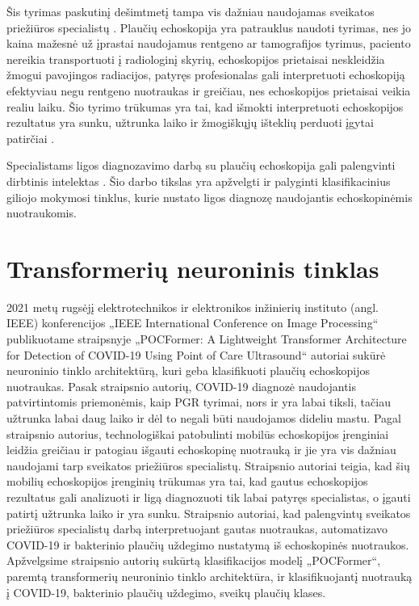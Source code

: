 \documentclass[fleqn]{VUMIFKompMagistrinis}
\begin{document}
\par
Šis tyrimas paskutinį dešimtmetį tampa vis dažniau naudojamas sveikatos priežiūros specialistų \cite{demi2023new}. Plaučių echoskopija yra patrauklus naudoti tyrimas, nes jo kaina mažesnė už įprastai naudojamus rentgeno ar tamografijos tyrimus, paciento nereikia transportuoti į radiologinį skyrių, echoskopijos prietaisai neskleidžia žmogui pavojingos radiacijos, patyręs profesionalas gali interpretuoti echoskopiją efektyviau negu rentgeno nuotraukas ir greičiau, nes echoskopijos prietaisai veikia realiu laiku. Šio tyrimo trūkumas yra tai, kad išmokti interpretuoti echoskopijos rezultatus yra sunku, užtrunka laiko ir žmogiškųjų išteklių perduoti įgytai patirčiai \cite{cammarota2023lung}.

Specialistams ligos diagnozavimo darbą su plaučių echoskopija gali palengvinti dirbtinis intelektas \cite{demi2023new}. Šio darbo tikslas yra apžvelgti ir palyginti klasifikacinius giliojo mokymosi tinklus, kurie nustato ligos diagnozę naudojantis echoskopinėmis nuotraukomis. 



\section{Transformerių neuroninis tinklas}
2021 metų rugsėjį elektrotechnikos ir elektronikos inžinierių instituto (angl. IEEE) konferencijos „IEEE International Conference on Image Processing“ publikuotame straipsnyje „POCFormer: A Lightweight Transformer Architecture for Detection of COVID-19 Using Point of Care Ultrasound“ autoriai sukūrė neuroninio tinklo architektūrą, kuri geba klasifikuoti plaučių echoskopijos nuotraukas\cite{PAY21}. Pasak straipsnio autorių, COVID-19 diagnozė naudojantis patvirtintomis priemonėmis, kaip PGR tyrimai, nors ir yra labai tiksli, tačiau užtrunka labai daug laiko ir dėl to negali būti naudojamos dideliu mastu. Pagal straipsnio autorius, technologiškai patobulinti mobilūs echoskopijos įrenginiai leidžia greičiau ir patogiau išgauti echoskopinę nuotrauką ir jie yra vis dažniau naudojami tarp sveikatos priežiūros specialistų. Straipsnio autoriai teigia, kad šių mobilių echoskopijos įrenginių trūkumas yra tai, kad gautus echoskopijos rezultatus gali analizuoti ir ligą diagnozuoti tik labai patyręs specialistas, o įgauti patirtį užtrunka laiko ir yra sunku. Straipsnio autoriai, kad palengvintų sveikatos priežiūros specialistų darbą interpretuojant gautas nuotraukas, automatizavo COVID-19 ir bakterinio plaučių uždegimo nustatymą iš echoskopinės nuotraukos. Apžvelgsime straipsnio autorių sukūrtą klasifikacijos modelį „POCFormer“, paremtą transformerių neuroninio tinklo architektūra, ir klasifikuojantį nuotrauką į COVID-19, bakterinio plaučių uždegimo, sveikų plaučių klases. \cite{PAY21}
\end{document}
